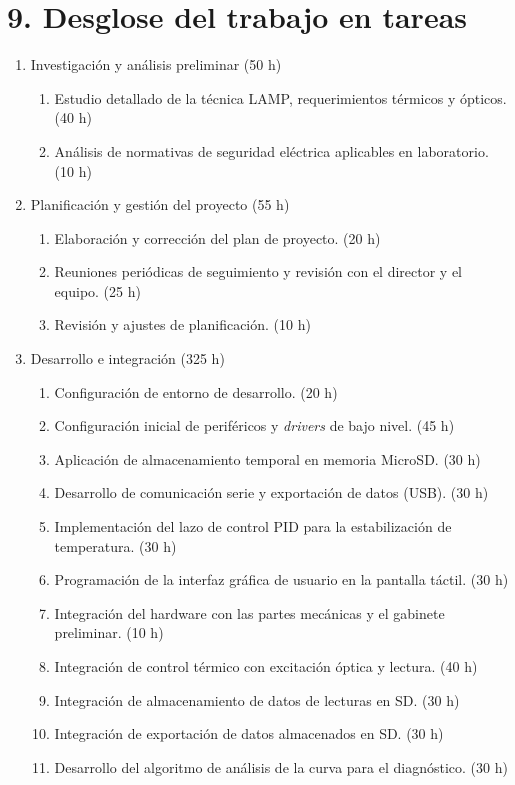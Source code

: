\documentclass[
11pt, %
]{charter}
\begin{document}
\section{9. Desglose del trabajo en tareas}
\label{sec:wbs}

\begin{enumerate}


\item Investigación y análisis preliminar (50 h)
	\begin{enumerate}
	\item Estudio detallado de la técnica LAMP, requerimientos térmicos y ópticos. (40 h)
	\item Análisis de normativas de seguridad eléctrica aplicables en laboratorio. (10 h)
	\end{enumerate}
	
\item Planificación y gestión del proyecto (55 h)
	\begin{enumerate}
	\item Elaboración y corrección del plan de proyecto. (20 h)
	\item Reuniones periódicas de seguimiento y revisión con el director y el equipo. (25 h)
	\item Revisión y ajustes de planificación. (10 h)
	\end{enumerate}


\item Desarrollo e integración (325 h)
	\begin{enumerate}
	\item Configuración de entorno de desarrollo. (20 h)
	\item Configuración inicial de periféricos y \textit{drivers} de bajo nivel. (45 h)
	\item Aplicación de almacenamiento temporal en memoria MicroSD. (30 h)
	\item Desarrollo de comunicación serie y exportación de datos (USB). (30 h)
	\item Implementación del lazo de control PID para la estabilización de temperatura. (30 h)
	\item Programación de la interfaz gráfica de usuario en la pantalla táctil. (30 h)
	\item Integración del hardware con las partes mecánicas y el gabinete preliminar. (10 h)
	\item Integración de control térmico con excitación óptica y lectura. (40 h)
	\item Integración de almacenamiento de datos de lecturas en SD. (30 h)
	\item Integración de exportación de datos almacenados en SD. (30 h)
	\item Desarrollo del algoritmo de análisis de la curva para el diagnóstico. (30 h)
	\end{enumerate}


\end{enumerate}
\end{document}
